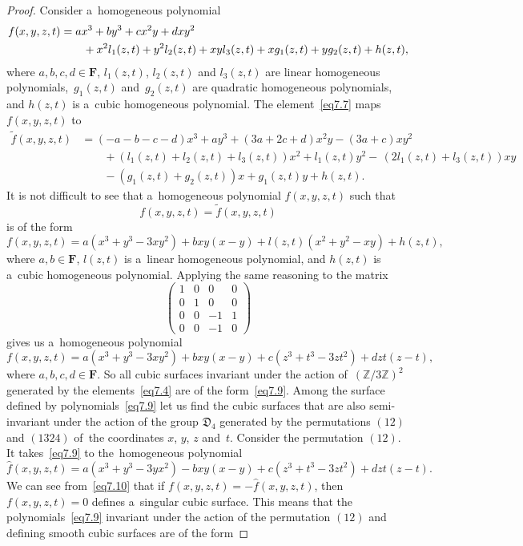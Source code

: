 \documentclass{amsart}
\numberwithin{equation}{section}
\theoremstyle{plain}
\theoremstyle{definition}
\theoremstyle{remark}
\begin{document}
\begin{proof}
Consider a~homogeneous polynomial
\begin{align}
\notag
f(x,y,z,t)
&=ax^3+by^3+cx^2y+dxy^2
\\
&\qquad+x^2l_1(z,t)+y^2l_2(z,t)+xyl_3(z,t)+xg_1(z,t)+yg_2(z,t)+h(z,t),
\label{eq7.8}
\end{align}
where $a,b,c,d \in \mathbf{F}$, $l_1(z,t)$, $l_2(z,t)$ and $l_3(z,t)$ are linear homogeneous polynomials,~$g_1(z,t)$ and~$g_2(z,t)$ are quadratic homogeneous polynomials, and $h(z,t)$ is a~cubic homogeneous polynomial. The element~\eqref{eq7.7} maps $f(x,y,z,t)$ to
\begin{align*}
\widetilde{f}(x,y,z,t)
&=(-a-b-c-d)x^3+ay^3+(3a+2c+d)x^2y-(3a+c)xy^2
\\
&\qquad
+(l_1(z,t)+l_2(z,t)+l_3(z,t))x^2+l_1(z,t)y^2{-}\,(2l_1(z,t)+l_3(z,t))xy
\\
&\qquad
-(g_1(z,t)+g_2(z,t))x+g_1(z,t)y+h(z,t).
\end{align*}
It is not difficult to see that a~homogeneous polynomial $f(x,y,z,t)$ such that
$$
f(x,y,z,t)=\widetilde{f}(x,y,z,t)
$$
is of the form
$$
f(x,y,z,t)=a(x^3+y^3-3xy^2)+bxy(x-y)+l(z,t)(x^2+y^2-xy)+h(z,t),
$$
where $a,b \in \mathbf{F}$, $l(z,t)$ is a~linear homogeneous polynomial, and $h(z,t)$ is a~cubic homogeneous polynomial. Applying the same reasoning to the matrix
$$
\begin{pmatrix}
1 & 0 & 0 & 0\\
0 & 1 & 0 & 0\\
0 & 0 & -1 & 1\\
0 & 0 & -1 & 0
\end{pmatrix}
$$
gives us a~homogeneous polynomial
\begin{equation}
\label{eq7.9}
f(x,y,z,t)=a(x^3+y^3-3xy^2)+bxy(x-y)+c(z^3+t^3-3zt^2)+dzt(z-t),
\end{equation}
where $a,b,c,d \in \mathbf{F}$. So all cubic surfaces invariant under the action of~$(\mathbb{Z}/3\mathbb{Z})^2$ generated by the elements~\eqref{eq7.4} are of the form~\eqref{eq7.9}. Among the surface defined by polynomials~\eqref{eq7.9} let us find the cubic surfaces that are also semi-invariant under the action of the group $\mathfrak{D}_4$ generated by the permutations $(12)$ and $(1324)$ of~the coordinates $x$, $y$, $z$ and~$t$. Consider the permutation $(12)$. It takes~\eqref{eq7.9} to the~homogeneous polynomial
\begin{equation}
\label{eq7.10}
\widehat{f}(x,y,z,t)=a(x^3+y^3-3yx^2)-bxy(x-y)+c(z^3+t^3-3zt^2)+dzt(z-t).
\end{equation}
We can see from~\eqref{eq7.10} that if $f(x,y,z,t)=-\widehat{f}(x,y,z,t)$, then $f(x,y,z,t)=0$ defines a~singular cubic surface. This means that the polynomials~\eqref{eq7.9} invariant under the action of the permutation $(12)$ and defining smooth cubic surfaces are of the form

\end{proof}
\end{document}
